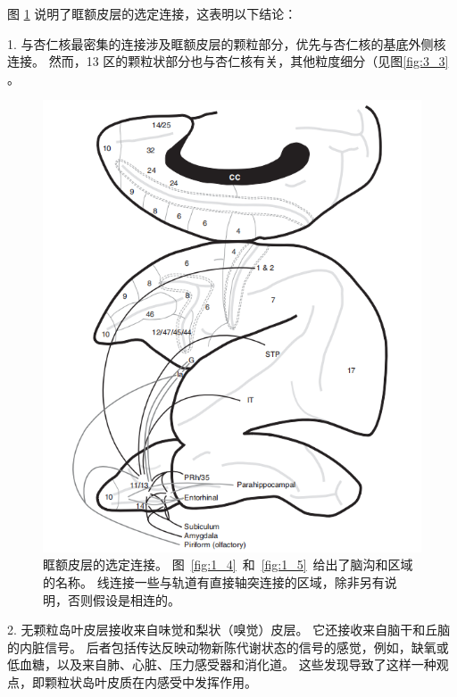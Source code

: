 图 \ref{fig:fig_4_2} 说明了眶额皮层的选定连接，这表明以下结论：\par


1. 与杏仁核最密集的连接涉及眶额皮层的颗粒部分，优先与杏仁核的基底外侧核连接。
然而，13 区的颗粒状部分也与杏仁核有关，其他粒度细分（见图\ref{fig:3_3}
\cite{carmichael1995limbic}。\par


\begin{figure}[!htb]
	\centering
	\includegraphics{image_pfc/Fig_4_2}
	\caption{眶额皮层的选定连接。
		图~\ref{fig:1_4}~和~\ref{fig:1_5}~给出了脑沟和区域的名称。
		线连接一些与轨道有直接轴突连接的区域，除非另有说明，否则假设是相连的。}\label{fig:fig_4_2}
\end{figure}


2. 无颗粒岛叶皮层接收来自味觉和梨状（嗅觉）皮层\cite{carmichael1995sensory}。
它还接收来自脑干和丘脑的内脏信号\cite{ray1992organization}。
后者包括传达反映动物新陈代谢状态的信号的感觉，例如，缺氧或低血糖，以及来自肺、心脏、压力感受器和消化道\cite{craig2002you}。
这些发现导致了这样一种观点，即颗粒状岛叶皮质在内感受中发挥作用。\par


